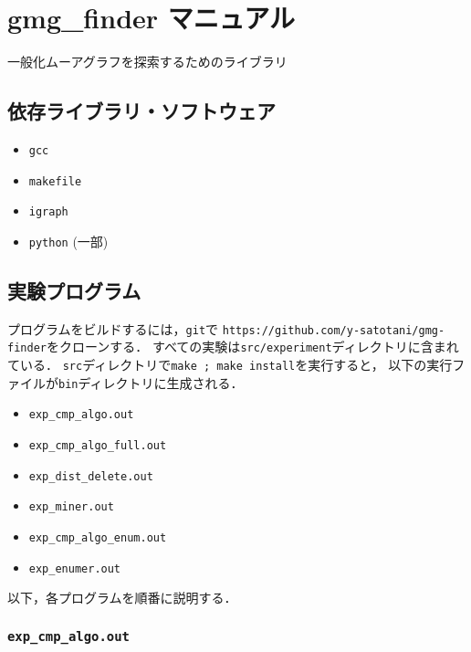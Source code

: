 \chapter{gmg\_finder マニュアル}\label{chap-experimental-program}

一般化ムーアグラフを探索するためのライブラリ

\section*{依存ライブラリ・ソフトウェア}\label{ux4f9dux5b58ux30e9ux30a4ux30d6ux30e9ux30eaux30bdux30d5ux30c8ux30a6ux30a7ux30a2}

\begin{itemize}
\tightlist
\item
  \texttt{gcc}
\item
  \texttt{makefile}
\item
  \texttt{igraph}
\item
  \texttt{python} (一部)
\end{itemize}

\section*{実験プログラム}\label{ux5b9fux9a13ux30d7ux30edux30b0ux30e9ux30e0}

プログラムをビルドするには，\texttt{git}で
\texttt{https://github.com/y-satotani/gmg-finder}をクローンする．
すべての実験は\texttt{src/experiment}ディレクトリに含まれている．
\texttt{src}ディレクトリで\texttt{make\ ;\ make\ install}を実行すると，
以下の実行ファイルが\texttt{bin}ディレクトリに生成される．

\begin{itemize}
\tightlist
\item
  \texttt{exp\_cmp\_algo.out}
\item
  \texttt{exp\_cmp\_algo\_full.out}
\item
  \texttt{exp\_dist\_delete.out}
\item
  \texttt{exp\_miner.out}
\item
  \texttt{exp\_cmp\_algo\_enum.out}
\item
  \texttt{exp\_enumer.out}
\end{itemize}

以下，各プログラムを順番に説明する．

\subsection*{\texorpdfstring{\texttt{exp\_cmp\_algo.out}}{exp\_cmp\_algo.out}}\label{expux5fcmpux5falgo.out}

